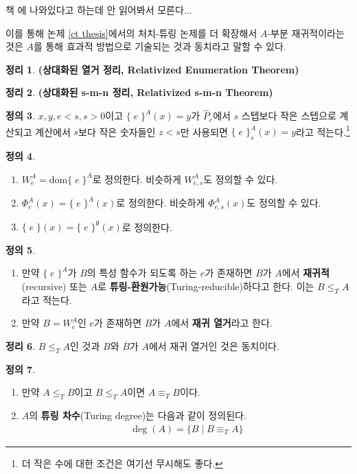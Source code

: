 \documentclass[b5paper, 11pt]{book}
\theoremstyle{definition}
\newtheorem{defn}{정의}[chapter]
\newtheorem{thm}[defn]{정리}
\newenvironment{pf*}{\pushQED{\qed}\pf}
{\popQED\endpf}
\begin{document}
\begin{pf*}
    책 \cite{kleene1952introduction}에 나와있다고 하는데 안 읽어봐서 모른다...
\end{pf*}
이를 통해 논제 \ref{ct thesis}에서의 처치-튜링 논제를 더 확장해서 $A$-부분 재귀적이라는 것은 $A$를 통해 효과적 방법으로 기술되는 것과 동치라고 말할 수 있다.
\begin{thm}
    \textbf{(상대화된 열거 정리, Relativized Enumeration Theorem)}
\end{thm}
\begin{thm}
    \textbf{(상대화된 s-m-n 정리, Relativized s-m-n Theorem)}
\end{thm}
\begin{defn}
    $x, y, e < s, s > 0$이고 $\{\; e\; \}^A (x) = y$가 $\hat{P}_e$에서 $s$ 스텝보다 작은 스텝으로 계산되고 계산에서 $s$보다 작은 숫자들인 $z < s$만 사용되면 $\{\; e\; \}^A_s (x) = y$라고 적는다.\footnote{더 작은 수에 대한 조건은 여기선 무시해도 좋다.}
\end{defn}
\begin{defn}
    \begin{enumerate}
        \item $W^A_e = \mathrm{dom} \{\; e\; \}^A$로 정의한다. 비슷하게 $W^A_{e, s}$도 정의할 수 있다.
        \item $\Phi_e^A (x) = \{\; e\; \}^A (x)$로 정의한다. 비슷하게 $\Phi_{e,s}^A (x)$도 정의할 수 있다. 
        \item $\{\; e \; \} (x) = \{\;e\;\}^{\emptyset} (x)$로 정의한다.
    \end{enumerate}
\end{defn}
\begin{defn}
    \begin{enumerate}
        \item 만약 $\{\;e\;\}^A$가 $B$의 특성 함수가 되도록 하는 $e$가 존재하면 $B$가 $A$에서 \textbf{재귀적}(recursive) 또는 $A$로 \textbf{튜링-환원가능}(Turing-reducible)하다고 한다. 이는 $B \le_T A$라고 적는다.
        \item 만약 $B = W_e^A$인 $e$가 존재하면 $B$가 $A$에서 \textbf{재귀 열거}라고 한다. 
    \end{enumerate}
\end{defn}
\begin{thm}
    $B \le_T A$인 것과 $B$와 $\overline{B}$가 $A$에서 재귀 열거인 것은 동치이다.
\end{thm}
\begin{defn}
    \begin{enumerate}
        \item 만약 $A \le_T B$이고 $B \le_T A$이면 $A \equiv_T B$이다.
        \item $A$의 \textbf{튜링 차수}(Turing degree)는 다음과 같이 정의된다.
        \begin{align*}
            \deg (A) = \{B \;\vert\; B \equiv_T A\}
        \end{align*}
    \end{enumerate}
\end{defn}
\end{document}
